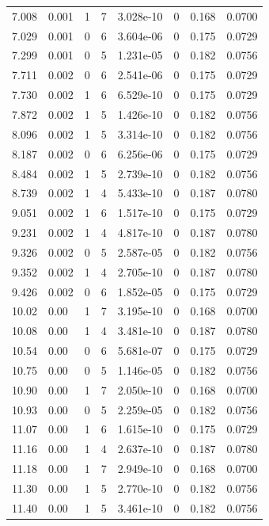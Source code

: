 \documentclass[preview]{standalone}
\begin{document}
{{\begin{tabular}{L{1.2cm}C{1.2cm} C{0.3cm}C{0.5cm} C{1.4cm}C{1.4cm} C{1.4cm}C{1.4cm}}
  7.008  &  0.001  & 1     &  7 &  3.028e-10  & 0  & 0.168 &  0.0700   \\ 
  7.029  &  0.001  & 0     &  6 &  3.604e-06  & 0  & 0.175 &  0.0729   \\ 
  7.299  &  0.001  & 0     &  5 &  1.231e-05  & 0  & 0.182 &  0.0756   \\ 
  7.711  &  0.002  & 0     &  6 &  2.541e-06  & 0  & 0.175 &  0.0729   \\ 
  7.730  &  0.002  & 1     &  6 &  6.529e-10  & 0  & 0.175 &  0.0729   \\ 
  7.872  &  0.002  & 1     &  5 &  1.426e-10  & 0  & 0.182 &  0.0756   \\ 
  8.096  &  0.002  & 1     &  5 &  3.314e-10  & 0  & 0.182 &  0.0756   \\ 
  8.187  &  0.002  & 0     &  6 &  6.256e-06  & 0  & 0.175 &  0.0729   \\ 
  8.484  &  0.002  & 1     &  5 &  2.739e-10  & 0  & 0.182 &  0.0756   \\ 
  8.739  &  0.002  & 1     &  4 &  5.433e-10  & 0  & 0.187 &  0.0780   \\ 
  9.051  &  0.002  & 1     &  6 &  1.517e-10  & 0  & 0.175 &  0.0729   \\ 
  9.231  &  0.002  & 1     &  4 &  4.817e-10  & 0  & 0.187 &  0.0780   \\ 
  9.326  &  0.002  & 0     &  5 &  2.587e-05  & 0  & 0.182 &  0.0756   \\ 
  9.352  &  0.002  & 1     &  4 &  2.705e-10  & 0  & 0.187 &  0.0780   \\ 
  9.426  &  0.002  & 0     &  6 &  1.852e-05  & 0  & 0.175 &  0.0729   \\ 
  10.02  &  0.00  & 1     &  7 &  3.195e-10  & 0  & 0.168 &  0.0700   \\ 
  10.08  &  0.00  & 1     &  4 &  3.481e-10  & 0  & 0.187 &  0.0780   \\ 
  10.54  &  0.00  & 0     &  6 &  5.681e-07  & 0  & 0.175 &  0.0729   \\ 
  10.75  &  0.00  & 0     &  5 &  1.146e-05  & 0  & 0.182 &  0.0756   \\ 
  10.90  &  0.00  & 1     &  7 &  2.050e-10  & 0  & 0.168 &  0.0700   \\ 
  10.93  &  0.00  & 0     &  5 &  2.259e-05  & 0  & 0.182 &  0.0756   \\ 
  11.07  &  0.00  & 1     &  6 &  1.615e-10  & 0  & 0.175 &  0.0729   \\ 
  11.16  &  0.00  & 1     &  4 &  2.637e-10  & 0  & 0.187 &  0.0780   \\ 
  11.18  &  0.00  & 1     &  7 &  2.949e-10  & 0  & 0.168 &  0.0700   \\ 
  11.30  &  0.00  & 1     &  5 &  2.770e-10  & 0  & 0.182 &  0.0756   \\ 
  11.40  &  0.00  & 1     &  5 &  3.461e-10  & 0  & 0.182 &  0.0756   \\ 
\hline 
\end{tabular} 

}}
\end{document}
